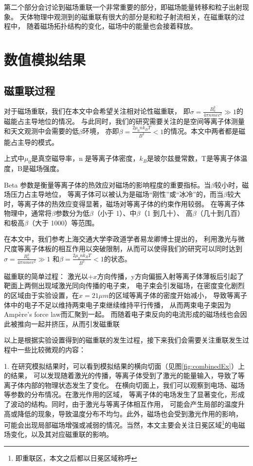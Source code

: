 第二个部分会讨论到磁场重联一个非常重要的部分，即磁场能量转移和粒子出射现象。
天体物理中观测到的磁重联有很大的部分是和粒子射流相关，在磁重联的过程中，
随着磁场拓扑结构的变化，磁场中的能量也会接着释放。

\section[\textnormal{数值模拟结果}]{\textbf{数值模拟结果}}

\subsection[\textnormal{磁重联过程}]{\textbf{磁重联过程}}

对于磁场重联，我们在本文中会希望关注相对论性磁重联，
即$\displaystyle\sigma=\frac{B_0^2}{4\pi nme c^2}\gg 1$的磁能占主导地位的情况。
与此同时，我们的研究需要关注的是空间等离子体测量和天文观测中会需要的低$\beta$环境，
亦即$\displaystyle\beta = \frac{2\mu_0nk_BT}{B^2}<1$\cite{10.1063/1.3694119}的情况。本文中两者都是磁能占主导的模式。

上式中$\mu_0$是真空磁导率，n 是等离子体密度，$k_B$是玻尔兹曼常数，T是等离子体温度，B是磁场强度。

Beta 参数是衡量等离子体的热效应对磁场的影响程度的重要指标。当$\beta$较小时，磁场压力占主导地位，
等离子体可以被认为是磁场“刚性”或“冰冷”的，而当$\beta$较大时，等离子体的热效应变得显著，磁场对等离子体的约束作用较弱。
在等离子体物理中，通常将$\beta$参数分为低$\beta$（小于 1）、中$\beta$（1 到几十）、
高$\beta$（几十到几百）和极高$\beta$（大于 1000）等范围。

在本文中，我们参考上海交通大学李政道学者易龙卿博士\cite{Yi_2018}提出的，
利用激光与微尺度等离子体板的相互作用以突破限制\cite{10.1063/1.3694119}，从而可以使得我们的研究可以同时达到$\displaystyle\sigma=\frac{B_0^2}{4\pi nme c^2}\gg 1$
和$\displaystyle\beta = \frac{2\mu_0nk_BT}{B^2} <1$的状态。

磁重联的简单过程：
激光以$+x$方向传播，y方向偏振入射等离子体薄板后引起了靶面上两侧出现域激光同向传播的电子束，
电子束会引发磁场，在密度变化剧烈的区域由于实验设置，在$x=21\mu m$的区域等离子体的密度开始减小，
导致等离子体中的电子不足以维持两束电子束继续维持平行传播，
从而两束电子束因为Ampère's force law而汇聚到一起\cite{Yi_2018}。
而随着电子束反向的电流形成的磁场线也会因此被推向一起并挤压，从而引发磁重联

以上是根据实验设置得到的磁重联的发生过程，接下来我们会需要关注重联发生过程中一些比较微观的内容：

1. 在研究模拟结果时，可以看到模拟结果的横向切面（见图\ref{fig:combinedEx}）上的结果，
可以发现随着激光的传播，等离子体受到了激光的能量输入，导致了等离子体内部的物理状态发生了变化。
在横向切面上，我们可以观察到电场、磁场等参数的分布情况。在激光作用的区域，
等离子体的电场发生了显著变化，形成了波动的结构。同时，由于激光与等离子体相互作用，
可能会产生局部的温度升高或降低的现象，导致温度分布不均匀。此外，磁场也会受到激光作用的影响，
可能会出现局部磁场增强或减弱的情况。当然，本文主要会关注日冕区域\footnote{即重联区，本文之后都以日冕区域称呼}的电磁场变化，以及其对应磁重联的影响。

